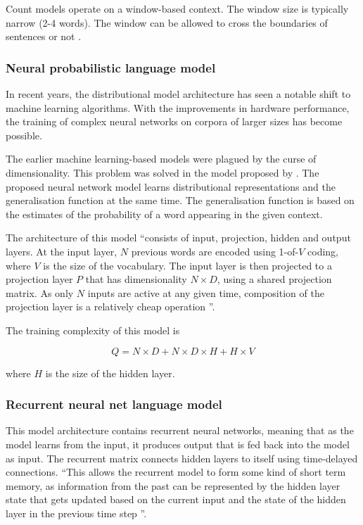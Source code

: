 \documentclass[14pt, a4paper]{extreport}
\begin{document}
Count models operate on a window-based context. The window size is typically narrow (2-4 words). The window can be allowed to cross the boundaries of sentences or not \parencite{baroni}.
      \subsubsection{Neural probabilistic language model}
In recent years, the distributional model architecture has seen a notable shift to machine learning algorithms. With the improvements in hardware performance, the training of complex neural networks on corpora of larger sizes has become possible. 

The earlier machine learning-based models were plagued by the curse of dimensionality. This problem was solved in the model proposed by \parencite{bengio}. The proposed neural network model learns distributional representations and the generalisation function at the same time. The generalisation function is based on the estimates of the probability of a word appearing in the given context.

The architecture of this model ``consists of input, projection, hidden and output layers. At the input layer, \(N\) previous words are encoded using 1-of-\(V\) coding, where \(V\) is the size of the vocabulary. The input layer is then projected to a projection layer \(P\) that has dimensionality \(N \times D\), using a shared projection matrix. As only \(N\) inputs are active at any given time, composition of the projection layer is a relatively cheap operation \parencite{mikolov}''.

The training complexity of this model is

\[Q = N \times D + N \times D \times H + H \times V\]

where \(H\) is the size of the hidden layer.
      \subsubsection{Recurrent neural net language model}
This model architecture contains recurrent neural networks, meaning that as the model learns from the input, it produces output that is fed back into the model as input. The recurrent matrix connects hidden layers to itself using time-delayed connections. ``This allows the recurrent model to form some kind of short term memory, as information from the past can be represented by the hidden layer state that gets updated based on the current input and the state of the hidden layer in the previous time step \parencite{mikolov}''.
\end{document}
